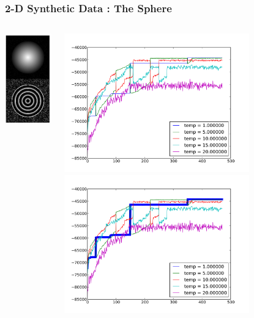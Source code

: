 \documentclass[compress]{beamer}
\begin{document}
\begin{frame}
  \frametitle{2-D Synthetic Data : The Sphere}
  \begin{columns}
    \begin{column}{3cm}
      \includegraphics[width=3cm]{sphere2_128_image}
    \end{column}
    
    \begin{column}{8cm}
       {
        \includegraphics[width=8cm]{sphere2_128_all_loglikelihood}
      }
       {
        \includegraphics[width=8cm]{sphere2_128_all_loglikelihood_highlight}
      }
    \end{column}
  \end{columns}

\end{frame}
\end{document}
